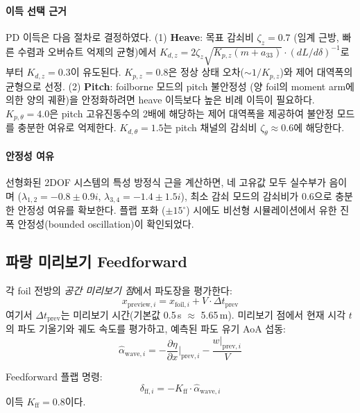 \documentclass[11pt]{report}
\numberwithin{equation}{chapter}
\numberwithin{figure}{chapter}
\numberwithin{table}{chapter}
\begin{document}
\paragraph{이득 선택 근거}
PD 이득은 다음 절차로 결정하였다.
(1) \textbf{Heave}: 목표 감쇠비 $\zeta_z = 0.7$ (임계 근방, 빠른 수렴과 오버슈트 억제의 균형)에서
$K_{d,z} = 2\zeta_z \sqrt{K_{p,z}(m + a_{33})} \cdot (dL/d\delta)^{-1}$로부터
$K_{d,z} = 0.3$이 유도된다.
$K_{p,z} = 0.8$은 정상 상태 오차($\sim 1/K_{p,z}$)와 제어 대역폭의 균형으로 선정.
(2) \textbf{Pitch}: foilborne 모드의 pitch 불안정성
(양 foil의 moment arm에 의한 양의 궤환)을 안정화하려면
heave 이득보다 높은 비례 이득이 필요하다.
$K_{p,\theta} = 4.0$은 pitch 고유진동수의 2배에 해당하는 제어 대역폭을 제공하여
불안정 모드를 충분한 여유로 억제한다.
$K_{d,\theta} = 1.5$는 pitch 채널의 감쇠비 $\zeta_\theta \approx 0.6$에 해당한다.

\paragraph{안정성 여유}
선형화된 2DOF 시스템의 특성 방정식 근을 계산하면,
네 고유값 모두 실수부가 음이며 ($\lambda_{1,2} = -0.8 \pm 0.9i$,
$\lambda_{3,4} = -1.4 \pm 1.5i$), 최소 감쇠 모드의 감쇠비가 0.6으로
충분한 안정성 여유를 확보한다.
플랩 포화 ($\pm 15^\circ$) 시에도 비선형 시뮬레이션에서
유한 진폭 안정성(bounded oscillation)이 확인되었다.

\subsection{파랑 미리보기 Feedforward}

각 foil 전방의 \emph{공간 미리보기 점}에서 파도장을 평가한다:
\begin{equation}
  x_{\text{preview},i} = x_{\text{foil},i} + V \cdot \Delta t_{\text{prev}}
\end{equation}
여기서 $\Delta t_{\text{prev}}$는 미리보기 시간(기본값 0.5\,s $\approx$ 5.65\,m).
미리보기 점에서 현재 시각 $t$의 파도 기울기와 궤도 속도를 평가하고,
예측된 파도 유기 AoA 섭동:
\begin{equation}
  \hat{\alpha}_{\text{wave},i} = -\frac{\partial\eta}{\partial x}\bigg|_{\text{prev},i}
    - \frac{w|_{\text{prev},i}}{V}
\end{equation}

Feedforward 플랩 명령:
\begin{equation}
  \delta_{\text{ff},i} = -K_{\text{ff}} \cdot \hat{\alpha}_{\text{wave},i}
\end{equation}
이득 $K_{\text{ff}} = 0.8$이다.
\end{document}
